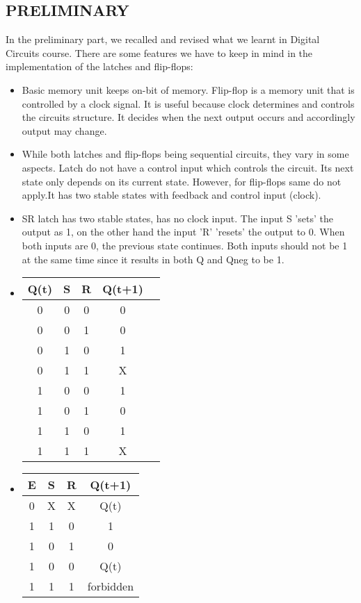 \documentclass[pdftex,12pt,a4paper]{article}
\begin{document}
\subsection{PRELIMINARY}
In the preliminary part, we recalled and revised what we learnt in Digital Circuits course. There are some features we have to keep in mind in the implementation of the latches and flip-flops:
\begin{itemize}
  \item Basic memory unit keeps on-bit of memory. Flip-flop is a memory unit that is controlled by a clock signal. It is useful because clock determines and controls the circuits structure. It decides when the next output occurs and accordingly output may change.
  \item While both latches and flip-flops being sequential circuits, they vary in some aspects. Latch do not have a control input which controls the circuit. Its next state only depends on its current state. However, for flip-flops same do not apply.It has two stable states with feedback and control input (clock).
  \item SR latch has two stable states, has no clock input. The input S 'sets' the output as 1, on the other hand the input 'R' 'resets' the output to 0. When both inputs are 0, the previous state continues. Both inputs should not be 1 at the same time since it results in both Q and Qneg to be 1.
  \item 
  
  \begin{center}
 \begin{tabular}{|c|c|c|c|c|} 
 \hline
 Q(t) & S & R & Q(t+1)  \\ 
 \hline\hline
 0 & 0 & 0 & 0 \\ 
 \hline
 0 & 0 & 1 & 0 \\
 \hline
 0 & 1 & 0 & 1\\
 \hline
 0 & 1 & 1 & X \\
  \hline
 1 & 0 & 0 & 1 \\ 
 \hline
 1 & 0 & 1 & 0 \\
 \hline
 1 & 1 & 0 & 1\\
 \hline
 1 & 1 & 1 & X \\
 \hline
\end{tabular}
\end{center}
  
  \item 
  
 \begin{center}
 \begin{tabular}{|c|c|c|c|} 
 \hline
 E & S & R & Q(t+1)  \\ 
 \hline\hline
 0 & X & X & Q(t)\\ 
 \hline
 1 & 1 & 0 & 1\\
 \hline
 1 & 0 & 1 & 0\\
 \hline
 1 & 0 & 0 & Q(t) \\
 \hline
 1 & 1 & 1 & forbidden \\
 \hline
\end{tabular}
\end{center}
  

\end{itemize}
\end{document}

